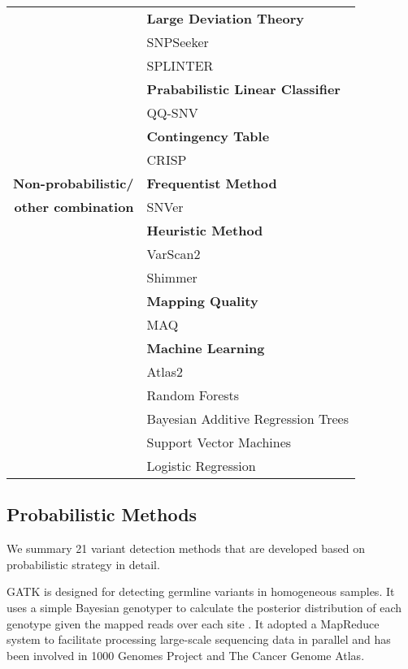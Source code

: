 \documentclass[11pt,reqno]{amsart}
\begin{document}
\begin{table}[htbp]
\begin{tabular}{rr}
          & \multicolumn{1}{l}{\textbf{Large Deviation Theory}} \\
          & \multicolumn{1}{l}{SNPSeeker} \\
          & \multicolumn{1}{l}{SPLINTER} \\
          & \multicolumn{1}{l}{\textbf{Prababilistic Linear Classifier }} \\
          & \multicolumn{1}{l}{QQ-SNV} \\
          & \multicolumn{1}{l}{\textbf{Contingency Table }} \\
          & \multicolumn{1}{l}{CRISP} \\
          \midrule
    \textbf{Non-probabilistic/} & \multicolumn{1}{l}{\textbf{Frequentist Method}} \\
    \textbf{other combination} & \multicolumn{1}{l}{SNVer} \\
         & \multicolumn{1}{l}{\textbf{Heuristic Method}} \\
         & \multicolumn{1}{l}{VarScan2} \\
         & \multicolumn{1}{l}{Shimmer} \\
         & \multicolumn{1}{l}{\textbf{Mapping Quality}} \\
         & \multicolumn{1}{l}{MAQ} \\
         & \multicolumn{1}{l}{\textbf{Machine Learning}} \\
         & \multicolumn{1}{l}{Atlas2} \\
         & \multicolumn{1}{l}{Random Forests} \\
         & \multicolumn{1}{l}{Bayesian Additive Regression Trees} \\
         & \multicolumn{1}{l}{Support Vector Machines} \\
         & \multicolumn{1}{l}{Logistic Regression} \\
    \bottomrule
    \end{tabular}
  \label{tab:addlabel}
\end{table}


\subsection{Probabilistic Methods}
We summary 21 variant detection methods that are developed based on probabilistic strategy in detail.

GATK \citep{McKenna2010} is designed for detecting germline variants in homogeneous samples.
It uses a simple Bayesian genotyper to calculate the posterior distribution of each genotype given the mapped reads over each site \citep{depristo2011framework}.
It adopted a MapReduce system to facilitate processing large-scale sequencing data in parallel and has been involved in 1000 Genomes Project and The Cancer Genome Atlas.
\end{document}
